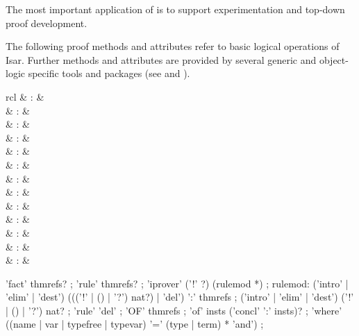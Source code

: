 \begin{isabellebody}
\begin{isamarkuptext}
\begin{descr}
  The most important application of  is to support
  experimentation and top-down proof development.

  \end{descr}%
\end{isamarkuptext}%
\isamarkuptrue%
%
\isamarkuptrue%
%
\begin{isamarkuptext}%
The following proof methods and attributes refer to basic logical
  operations of Isar.  Further methods and attributes are provided by
  several generic and object-logic specific tools and packages (see
   and ).

  \begin{matharray}{rcl}
    \isa{{\isacharminus}} & : & \isarmeth \\
     & : & \isarmeth \\
     & : & \isarmeth \\
     & : & \isarmeth \\
     & : & \isarmeth \\
     & : & \isarmeth \\[0.5ex]
     & : & \isaratt \\
     & : & \isaratt \\
     & : & \isaratt \\
     & : & \isaratt \\[0.5ex]
     & : & \isaratt \\
     & : & \isaratt \\
     & : & \isaratt \\
  \end{matharray}

  \begin{rail}
    'fact' thmrefs?
    ;
    'rule' thmrefs?
    ;
    'iprover' ('!' ?) (rulemod *)
    ;
    rulemod: ('intro' | 'elim' | 'dest') ((('!' | () | '?') nat?) | 'del') ':' thmrefs
    ;
    ('intro' | 'elim' | 'dest') ('!' | () | '?') nat?
    ;
    'rule' 'del'
    ;
    'OF' thmrefs
    ;
    'of' insts ('concl' ':' insts)?
    ;
    'where' ((name | var | typefree | typevar) '=' (type | term) * 'and')
    ;
  \end{rail}


\end{isamarkuptext}
\end{isabellebody}

